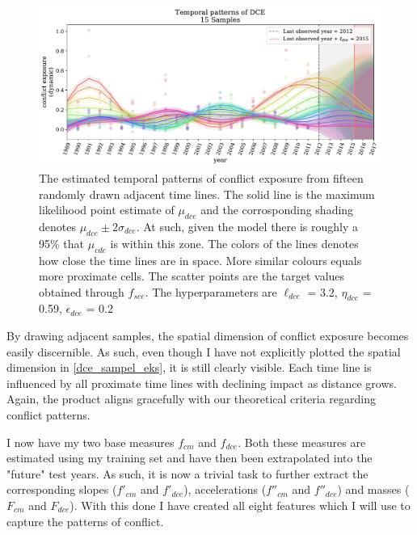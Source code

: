 \documentclass[a4paper]{article}
\begin{document}
\begin{figure}[!htb]
	\centering
	\includegraphics[scale=0.47]{dce_15_samples.pdf}
    \caption{\footnotesize{The estimated temporal patterns of conflict exposure from fifteen randomly drawn adjacent time lines. The solid line is the maximum likelihood point estimate of $\mu_{dce}$ and the corrosponding shading denotes $\mu_{dce} \pm 2\sigma_{dce}$. At such, given the model there is roughly a 95\% that $\mu_{cde}$ is within this zone. The colors of the lines denotes how close the time lines are in space. More similar colours equals more proximate cells. The scatter points are the target values obtained through $f_{sce}$. The hyperparameters are $\ell_{dce}$ = 3.2, $\eta_{dce}$ = 0.59, $\epsilon_{dce}$ = 0.2}}\label{dce_sampel_eks}
\end{figure}

By drawing adjacent samples, the spatial dimension of conflict exposure becomes easily discernible. As such, even though I have not explicitly plotted the spatial dimension in \autoref{dce_sampel_eks}, it is still clearly visible. Each time line is influenced by all proximate time lines with declining impact as distance grows. Again, the product aligns gracefully with our theoretical criteria regarding conflict patterns.\par

I now have my two base measures $f_{cm}$ and $f_{dce}$. Both these measures are estimated using my training set and have then been extrapolated into the "future" test years. As such, it is now a trivial task to further extract the corresponding slopes ($f'_{cm}$ and $f'_{dce}$), accelerations ($f''_{cm}$ and $f''_{dce}$) and masses ($F_{cm}$ and $F_{dce}$). With this done I have created all eight features which I will use to capture the patterns of conflict.\par
\end{document}
